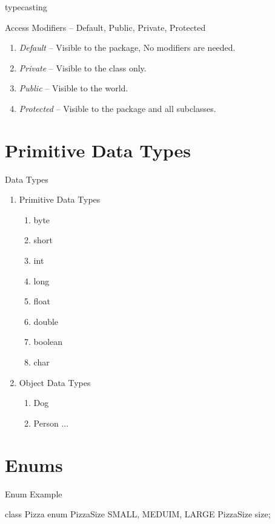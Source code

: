 \documentclass[11pt]{beamer}
\begin{document}
\begin{frame}{typecasting}

\end{frame}



\begin{frame}{Access Modifiers -- Default, Public, Private, Protected}

\begin{enumerate}
\item \emph{Default} -- Visible to the package,  No modifiers are needed.
\item \emph{Private} -- Visible to the class only.
\item \emph{Public} -- Visible to the world.
\item \emph{Protected} -- Visible to the package and all subclasses.    
\end{enumerate}

\section{Primitive Data Types}
\begin{frame}{Data Types}
\begin{enumerate}
\item Primitive Data Types
\begin{enumerate}
\item byte
\item short
\item int
\item long
\item float
\item double
\item boolean
\item char
\end{enumerate}
\item Object Data Types
\begin{enumerate}
\item Dog
\item Person ...
\end{enumerate}
\end{enumerate}
\end{frame}

\section{Enums}
\begin{frame}[containsverbatim]{Enum Example}
\begin{java}
class Pizza{
	enum PizzaSize{ SMALL, MEDUIM, LARGE }
	PizzaSize size;
}


\end{java}
\end{frame}
\end{frame}
\end{document}
